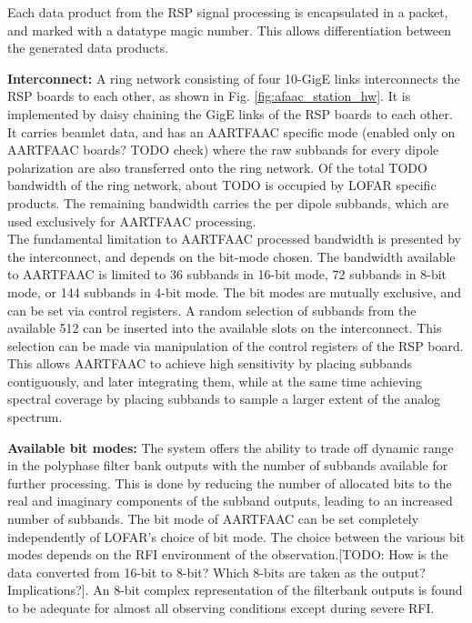 \documentclass{ws-jai}
\begin{document}
Each data  product from the RSP  signal processing is encapsulated  in a packet,
and marked with a datatype magic number. This allows differentiation between the
generated data products.

\textbf  {Interconnect:}  A  ring  network  consisting  of  four  10-GigE  links
interconnects    the    RSP   boards    to    each    other,   as    shown    in
Fig. \ref{fig:afaac_station_hw}.  It is implemented  by daisy chaining  the GigE
links of  the RSP  boards to  each other. It  carries beamlet  data, and  has an
AARTFAAC specific mode  (enabled only on AARTFAAC boards? TODO  check) where the
raw subbands  for every dipole polarization  are also transferred onto  the ring
network. Of the total TODO bandwidth of the ring network, about TODO is occupied
by  LOFAR specific  products. The  remaining  bandwidth carries  the per  dipole
subbands, which are used exclusively for AARTFAAC processing.\\

The fundamental limitation  to AARTFAAC processed bandwidth is  presented by the
interconnect, and  depends on the  bit-mode chosen.  The bandwidth  available to
AARTFAAC is limited to 36 subbands in 16-bit mode, 72 subbands in 8-bit mode, or
144 subbands in 4-bit mode. The bit modes are mutually exclusive, and can be set
via control  registers.  A random selection  of subbands from the  available 512
can be inserted into the available slots on the interconnect. This selection can
be made via manipulation of the control registers of the RSP board.  This allows
AARTFAAC to achieve high sensitivity by placing subbands contiguously, and later
integrating them, while at the same  time achieving spectral coverage by placing
subbands to sample a larger extent of the analog spectrum.

\textbf  {Available bit  modes:}  The system  offers the  ability  to trade  off
dynamic range in  the polyphase filter bank outputs with  the number of subbands
available  for further  processing.  This  is done  by  reducing  the number  of
allocated bits  to the  real and  imaginary components  of the  subband outputs,
leading to an increased number of subbands.  The bit mode of AARTFAAC can be set
completely independently of  LOFAR's choice of bit mode. The  choice between the
various bit modes  depends on the RFI environment of  the observation.[TODO: How
  is the  data converted  from 16-bit to  8-bit? Which 8-bits  are taken  as the
  output?  Implications?].  An  8-bit complex  representation of  the filterbank
outputs  is found  to be  adequate for  almost all  observing conditions  except
during severe RFI.
\end{document}
